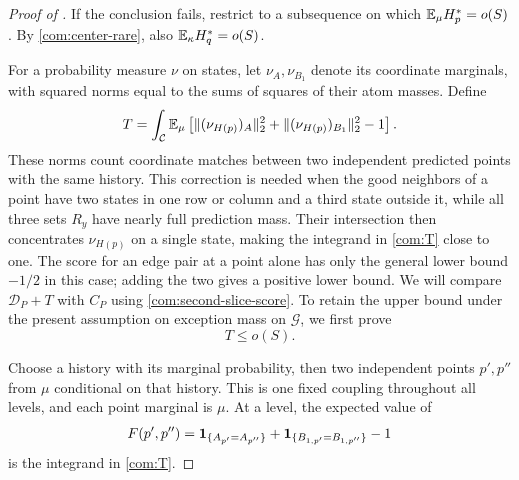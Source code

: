 \begin{proof}[Proof of ]
If the conclusion fails, restrict to a subsequence on which
\(\mathbb E_\mu H_p^*=o(S)\). By \eqref{com:center-rare}, also
\(\mathbb E_\kappa H_q^*=o(S)\).

For a probability measure \(\nu\) on states, let \(\nu_A,\nu_{B_1}\) denote
its coordinate marginals, with squared norms equal to the sums of squares of
their atom masses. Define
\begin{equation}\label{com:T}
 T=\int_{\mathcal C}\mathbb E_\mu\left[
       \lVert (\nu_{H(p)})_A\rVert_2^2+
       \lVert (\nu_{H(p)})_{B_1}\rVert_2^2-1\right].
\end{equation}
These norms count coordinate matches between two independent predicted
points with the same history. This correction is needed when the good neighbors of a point
have two states in one row or column and a third state outside it, while
all three sets \(R_y\) have nearly full prediction mass. Their
intersection then concentrates \(\nu_{H(p)}\) on a single state, making
the integrand in \eqref{com:T} close to one. The score for an edge pair at a point alone has only the general lower bound \(-1/2\) in this case;
adding the two gives a positive lower bound. We will compare \(\mathcal D_P+T\)
with \(C_P\) using \eqref{com:second-slice-score}. To retain the upper
bound under the present assumption on exception mass on $\mathcal G$, we first prove
\begin{equation}\label{com:prediction-score}
 T\le o(S).
\end{equation}

Choose a history with its marginal probability, then two independent points
\(p',p''\) from \(\mu\) conditional on that history. This is one fixed
coupling throughout all levels, and each point marginal is \(\mu\). At a
level, the expected value of
\[
 F(p',p'')=
   \mathbf 1_{\{A_{p'}=A_{p''}\}}+
   \mathbf 1_{\{B_{1,p'}=B_{1,p''}\}}-1
\]
is the integrand in \eqref{com:T}.


\end{proof}
